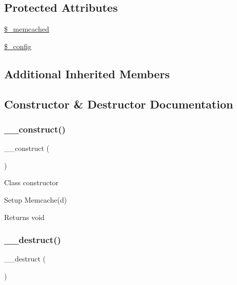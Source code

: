 \subsection*{Protected Attributes}
\begin{DoxyCompactItemize}
\item 
\mbox{\hyperlink{class_c_i___cache__memcached_a9ce5188201bbc41ed4374947a35dadcc}{\$\+\_\+memcached}}
\item 
\mbox{\hyperlink{class_c_i___cache__memcached_a4d4ad4af1600438042f93a4492f8dbbe}{\$\+\_\+config}}
\end{DoxyCompactItemize}
\subsection*{Additional Inherited Members}


\subsection{Constructor \& Destructor Documentation}
\mbox{\label{class_c_i___cache__memcached_a095c5d389db211932136b53f25f39685}} 
\subsubsection{\texorpdfstring{\+\_\+\+\_\+construct()}{\_\_construct()}}
{\footnotesize\ttfamily \+\_\+\+\_\+construct (\begin{DoxyParamCaption}{ }\end{DoxyParamCaption})}

Class constructor

Setup Memcache(d)

\begin{DoxyReturn}{Returns}
void 
\end{DoxyReturn}
\mbox{\label{class_c_i___cache__memcached_a421831a265621325e1fdd19aace0c758}} 
\subsubsection{\texorpdfstring{\+\_\+\+\_\+destruct()}{\_\_destruct()}}
{\footnotesize\ttfamily \+\_\+\+\_\+destruct (\begin{DoxyParamCaption}{ }\end{DoxyParamCaption})}

